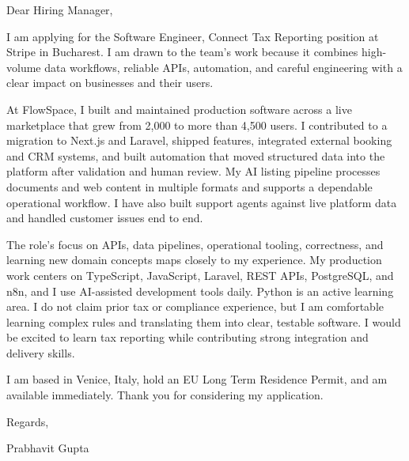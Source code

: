 \documentclass[a4paper,11pt]{article}
\begin{document}
Dear Hiring Manager,

I am applying for the Software Engineer, Connect Tax Reporting position at Stripe in Bucharest. I am drawn to the team's work because it combines high-volume data workflows, reliable APIs, automation, and careful engineering with a clear impact on businesses and their users.

At FlowSpace, I built and maintained production software across a live marketplace that grew from 2,000 to more than 4,500 users. I contributed to a migration to Next.js and Laravel, shipped features, integrated external booking and CRM systems, and built automation that moved structured data into the platform after validation and human review. My AI listing pipeline processes documents and web content in multiple formats and supports a dependable operational workflow. I have also built support agents against live platform data and handled customer issues end to end.

The role's focus on APIs, data pipelines, operational tooling, correctness, and learning new domain concepts maps closely to my experience. My production work centers on TypeScript, JavaScript, Laravel, REST APIs, PostgreSQL, and n8n, and I use AI-assisted development tools daily. Python is an active learning area. I do not claim prior tax or compliance experience, but I am comfortable learning complex rules and translating them into clear, testable software. I would be excited to learn tax reporting while contributing strong integration and delivery skills.

I am based in Venice, Italy, hold an EU Long Term Residence Permit, and am available immediately. Thank you for considering my application.

Regards,
\par
Prabhavit Gupta
\end{document}
